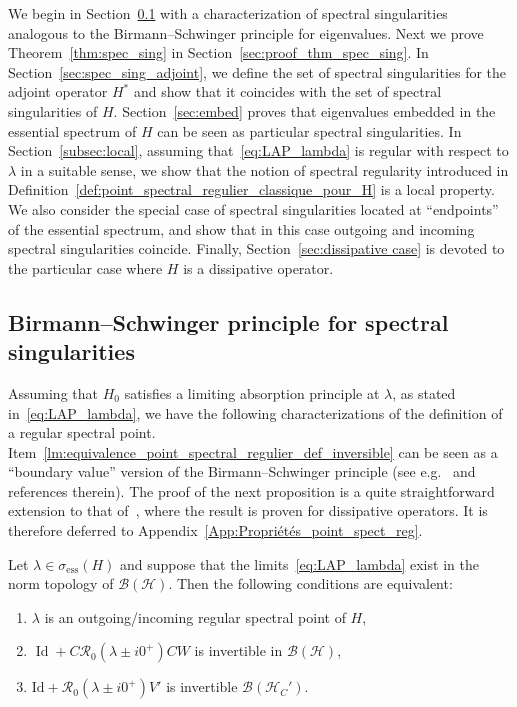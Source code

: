 \documentclass[AHL,Unicode,longabstracts,published]{cedram}
\newcommand{\Hi}{\mathcal{H}}
\newcommand{\ess}{\mathrm{ess}}
\newcommand{\Res}{\mathcal{R}}
\newcommand{\clB}{\mathcal{B}}
\DeclareMathOperator{\Id}{Id}
\newcommand*{\romanenumi}{\renewcommand*{\theenumi}{\roman{enumi}}}
\newcommand{\Hi}{\mathcal{H}}
\newcommand{\ess}{\mathrm{ess}}
\begin{document}
We begin in Section~\ref{sec:Birmann} with a characterization of spectral singularities analogous to the Birmann--Schwinger principle for eigenvalues. Next we prove Theorem~\ref{thm:spec_sing} in Section~\ref{sec:proof_thm_spec_sing}. In Section~\ref{sec:spec_sing_adjoint}, we define the set of spectral singularities for the adjoint operator $H^*$ and show that it coincides with the set of spectral singularities of $H$. Section~\ref{sec:embed} proves that eigenvalues embedded in the essential spectrum of $H$ can be seen as particular spectral singularities. In Section~\ref{subsec:local}, assuming that~\eqref{eq:LAP_lambda} is regular with respect to $\lambda$ in a suitable sense, we show that the notion of spectral regularity introduced in Definition~\ref{def:point_spectral_regulier_classique_pour_H} is a local property. We also consider the special case of spectral singularities located at ``endpoints'' of the essential spectrum, and show that in this case outgoing and incoming spectral singularities coincide. Finally, Section~\ref{sec:dissipative case} is devoted to the particular case where $H$ is a dissipative operator.



\subsection{Birmann--Schwinger principle for spectral singularities}\label{sec:Birmann}


Assuming that $H_0$ satisfies a limiting absorption principle at $\lambda$, as stated in~\eqref{eq:LAP_lambda}, we have the following characterizations of the definition of a regular spectral point. Item~\eqref{lm:equivalence_point_spectral_regulier_def_inversible} can be seen as a ``boundary value'' version of the Birmann--Schwinger principle (see e.g.~\cite{BeELGE21_01,GeLaMiZi,HaKr22_01} and references therein). The proof of the next proposition is a quite straightforward extension to that of~\cite[Lemma~4.1]{FaNi18_01}, where the result is proven for dissipative operators. It is therefore deferred to Appendix~\ref{App:Propriétés_point_spect_reg}.


\begin{prop}\label{lm:equivalence_point_spectral_regulier}
Let $\lambda\in \sigma_\ess(H)$ and suppose that the limits~\eqref{eq:LAP_lambda} exist in the norm topology of $\clB(\Hi)$. Then the following conditions are equivalent:
\begin{enumerate}\romanenumi
\item\label{lm:equivalence_point_spectral_regulier_def_limite}
$\lambda$ is an outgoing/incoming regular spectral point of $H$,
\item\label{lm:equivalence_point_spectral_regulier_def_inversible}
$\Id+C\Res_0(\lambda\pm i0^+)CW$ is invertible in $\clB(\Hi)$,
\item\label{lm:equivalence_point_spectral_regulier_def_inversible H_C}
$\mathrm{Id}+\Res_0(\lambda\pm i0^+)V'$ is invertible $\clB(\Hi_C')$.
\end{enumerate}
\end{prop}
\end{document}
